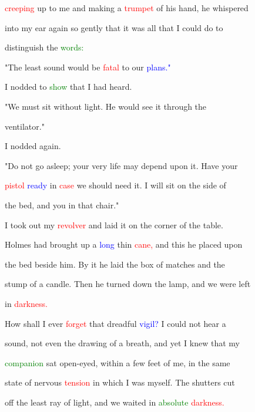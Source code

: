  \textcolor{red}{creeping} up to me and making a \textcolor{red}{trumpet} of his hand, he whispered

 into my ear again so gently that it was all that I could do to

 distinguish the \textcolor{green}{words:}



 "The least sound would be \textcolor{red}{fatal} to our \textcolor{blue}{plans."}



 I nodded to \textcolor{green}{show} that I had heard.



 "We must sit without light. He would see it through the

 ventilator."



 I nodded again.



 "Do not go asleep; your very life may \textcolor{BurntOrange}{depend} upon it. Have your

 \textcolor{red}{pistol} \textcolor{blue}{ready} in \textcolor{red}{case} we should need it. I will sit on the side of

 the bed, and you in that chair."



 I took out my \textcolor{red}{revolver} and laid it on the corner of the table.



 Holmes had brought up a \textcolor{blue}{long} thin \textcolor{red}{cane,} and this he placed upon

 the bed beside him. By it he laid the box of matches and the

 stump of a candle. Then he turned down the lamp, and we were left

 in \textcolor{red}{darkness.}



 How shall I ever \textcolor{red}{forget} that \textcolor{BurntOrange}{dreadful} \textcolor{blue}{vigil?} I could not hear a

 sound, not even the drawing of a breath, and yet I knew that my

 \textcolor{green}{companion} sat open-eyed, within a few feet of me, in the same

 state of \textcolor{BurntOrange}{nervous} \textcolor{red}{tension} in which I was myself. The shutters cut

 off the least ray of light, and we \textcolor{BurntOrange}{waited} in \textcolor{green}{absolute} \textcolor{red}{darkness.}



